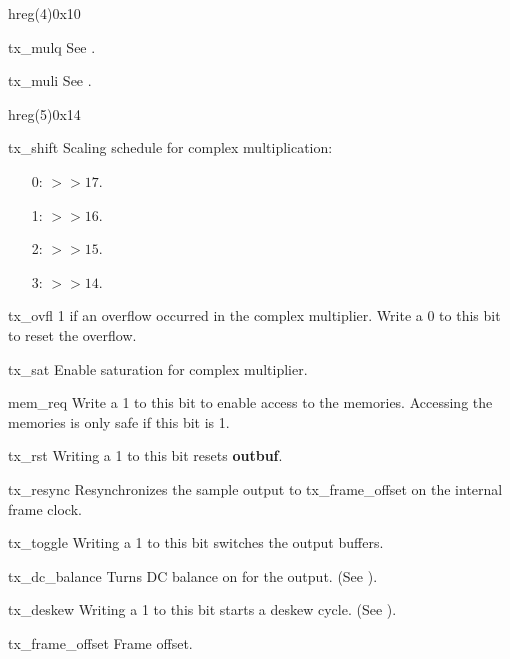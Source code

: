 \documentclass[11pt,technote,a4paper,onecolumn]{IEEEtran}
\newcommand{\module}[1]{{\ttfamily\bfseries #1}}
\begin{document}
\begin{register}{h}{reg(4)}{0x10}%
    \label{reg4}%
    \regnewline%
    \begin{regdesc}\begin{reglist}[tx\_mulq]
        \item[tx\_mulq] See .
        \item[tx\_muli] See .
    \end{reglist}\end{regdesc}
\end{register}
\begin{register}{h}{reg(5)}{0x14}%
    \label{reg5}%
    \regnewline%
    \begin{regdesc}\begin{reglist}
        \item[tx\_shift] Scaling schedule for complex multiplication:
            \begin{itemize}
                \item[0:] $>> 17$.
                \item[1:] $>> 16$.
                \item[2:] $>> 15$.
                \item[3:] $>> 14$.
            \end{itemize}
        \item[tx\_ovfl] 1 if an overflow occurred in the complex multiplier.
            Write a 0 to this bit to reset the overflow.
        \item[tx\_sat] Enable saturation for complex multiplier.
        \item[mem\_req] Write a 1 to this bit to enable access to the
            memories. Accessing the memories is only safe if this bit is 1.
        \item[tx\_rst] Writing a 1 to this bit resets \module{outbuf}.
        \item[tx\_resync] Resynchronizes the sample output to
            tx\_frame\_offset on the internal frame clock.
        \item[tx\_toggle] Writing a 1 to this bit switches the output buffers.
        \item[tx\_dc\_balance] Turns DC balance on for the output. (See
            \cite[p. 11]{ds90cr485}).
        \item[tx\_deskew] Writing a 1 to this bit starts a deskew cycle. (See
            \cite[p. 12f]{ds90cr485}).
        \item[tx\_frame\_offset] Frame offset.
    \end{reglist}\end{regdesc}
\end{register}
\end{document}
